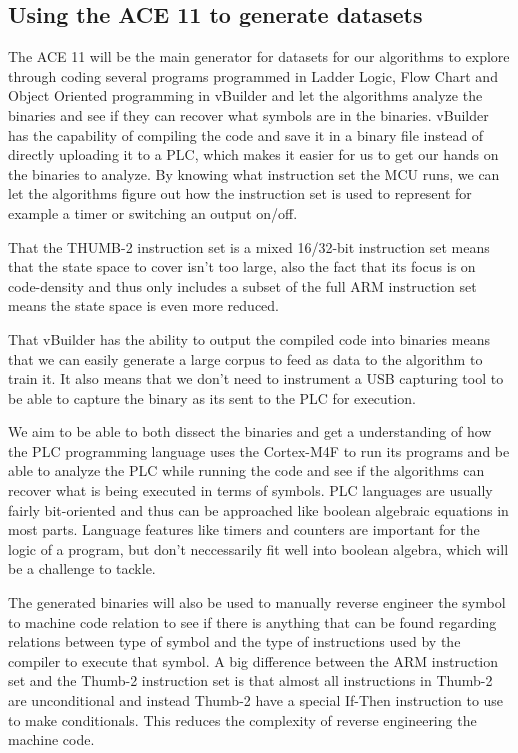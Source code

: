 \documentclass[11pt]{article}
\begin{document}
\subsection{Using the ACE 11 to generate datasets}
\label{sec:org98fa625}
The ACE 11 will be the main generator for datasets for our algorithms to explore through coding several programs programmed in Ladder Logic, Flow Chart and Object Oriented programming in vBuilder and let the algorithms analyze the binaries and see if they can recover what symbols are in the binaries. vBuilder has the capability of compiling the code and save it in a binary file instead of directly uploading it to a PLC, which makes it easier for us to get our hands on the binaries to analyze. By knowing what instruction set the MCU runs, we can let the algorithms figure out how the instruction set is used to represent for example a timer or switching an output on/off.

That the THUMB-2 instruction set is a mixed 16/32-bit instruction set means that the state space to cover isn't too large, also the fact that its focus is on code-density and thus only includes a subset of the full ARM instruction set means the state space is even more reduced.

That vBuilder has the ability to output the compiled code into binaries means that we can easily generate a large corpus to feed as data to the algorithm to train it. It also means that we don't need to instrument a USB capturing tool to be able to capture the binary as its sent to the PLC for execution.

We aim to be able to both dissect the binaries and get a understanding of how the PLC programming language uses the Cortex-M4F to run its programs and be able to analyze the PLC while running the code and see if the algorithms can recover what is being executed in terms of symbols. PLC languages are usually fairly bit-oriented and thus can be approached like boolean algebraic equations in most parts. Language features like timers and counters are important for the logic of a program, but don't neccessarily fit well into boolean algebra, which will be a challenge to tackle.

The generated binaries will also be used to manually reverse engineer the symbol to machine code relation to see if there is anything that can be found regarding relations between type of symbol and the type of instructions used by the compiler to execute that symbol. A big difference between the ARM instruction set and the Thumb-2 instruction set is that almost all instructions in Thumb-2 are unconditional and instead Thumb-2 have a special If-Then instruction to use to make conditionals. This reduces the complexity of reverse engineering the machine code.
\end{document}
